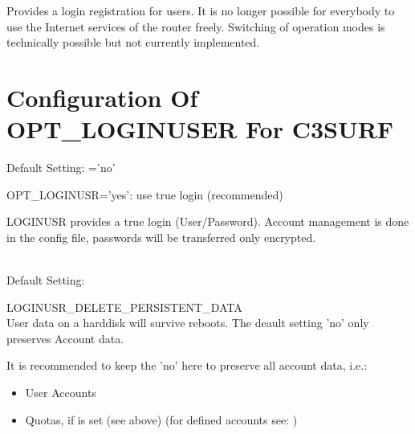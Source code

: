 Provides a login registration for users. It is no longer possible for everybody
to use the Internet services of the router freely. Switching of operation modes
is technically possible but not currently implemented.


\section{Configuration Of OPT\_LOGINUSER For C3SURF}

\begin{description}

  Default Setting: ='no'

  OPT\_LOGINUSR='yes': use true login (recommended)

  LOGINUSR provides a true login (User/Password). Account management is done
  in the config file, passwords will be transferred only encrypted.

\ \\
  Default Setting: 

  LOGINUSR\_DELETE\_PERSISTENT\_DATA\\
  User data on a harddisk will survive reboots.
  The deault setting 'no' only preserves Account data.


  It is recommended to keep the 'no' here to preserve all account data, i.e.:

\begin{itemize}
\item User Accounts
\item Quotas, if  is set
(see above) (for defined accounts see: )
\end{itemize}



\end{description}
